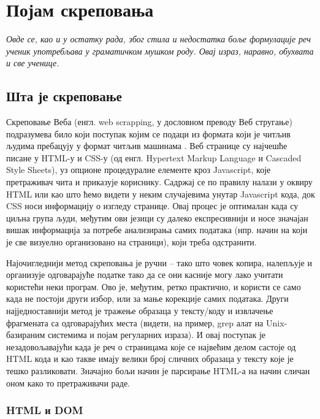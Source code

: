 \chapter{Појам скреповања}\label{ch:\thechapter}
\vspace*{-8mm}
\textit{Овде се, као и у остатку рада, због стила и недостатка боље формулације реч ученик употребљава у граматичком мушком роду. Овај израз, наравно, обухвата и све ученице.} %
\vspace{5mm}

\section{Шта је скреповање}

Скреповање Веба (енгл. web scrapping, у дословном преводу Веб стругање) подразумева било који поступак којим се подаци из формата који је читљив људима пребацују у формат читљив машинама \citep{boeing2017new}. Веб странице су најчешће писане у HTML-у и CSS-у (од енгл. Hypertext Markup Language и Cascaded Style Sheets), уз опционе процедуралне елементе кроз Javascript, које претраживач чита и приказује кориснику. Садржај се по правилу налази у оквиру HTML или као што ћемо видети у неким случајевима унутар Javascript кода, док CSS носи информацију о изгледу странице. Овај процес је оптималан када су циљна група људи, међутим ови језици су далеко експресивнији и носе значајан вишак информација за потребе анализирања самих података (нпр. начин на који је све визуелно организовано на страници), који треба одстранити. 

Најочигледнији метод скреповања је ручни -- тако што човек копира, налепљује и организује одговарајуће податке тако да се они касније могу лако учитати користећи неки програм. Ово је, међутим, ретко практично, и користи се само када не постоји други избор, или за мање корекције самих података. Други најједноставнији метод је тражење образаца у тексту/коду и извлачење фрагмената са одговарајућих места (видети, на пример, grep алат на Unix-базираним системима и појам регуларних израза). И овај поступак је незадовољавајући када је реч о страницама које се највећим делом састоје од HTML кода и као такве имају велики број сличних образаца у тексту које је тешко разликовати. Значајно бољи начин је парсирање HTML-а на начин сличан оном како то претраживачи раде.

\subsection{HTML и DOM}

